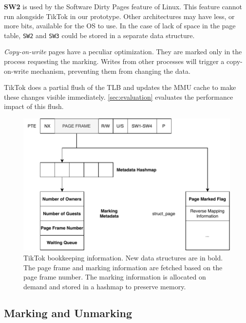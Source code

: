 \documentclass[conference]{IEEEtran}
\newcommand{\sysname}{TikTok}
\begin{document}
\textbf{SW2} is used by the Software Dirty Pages
feature of Linux. This feature cannot run alongside \sysname{} in our prototype.
Other architectures may have less, or more bits, available for the OS to use. In
the case of lack of space in the page table, \texttt{SW2} and \texttt{SW3} could
be stored in a separate data structure.

\emph{Copy-on-write} pages have a peculiar optimization. They are marked only in
the process requesting the marking. Writes from other processes will trigger a
copy-on-write mechanism, preventing them from changing the data.

\sysname{} does a partial flush of the TLB and updates the MMU cache to make these
changes visible immediately. \autoref{sec:evaluation} evaluates the performance
impact of this flush.

\begin{figure}[]
  \centering
  \includegraphics[width=\linewidth]{img/book-keeping.pdf}
  \caption{\sysname{} bookkeeping information. New data structures are in bold. The page frame and marking information are fetched based on the
  page frame number. The marking information is allocated on demand and stored
  in a hashmap to preserve memory.}
  \label{fig:bookkeeping}
\end{figure}

\subsection{Marking and Unmarking}
\end{document}
